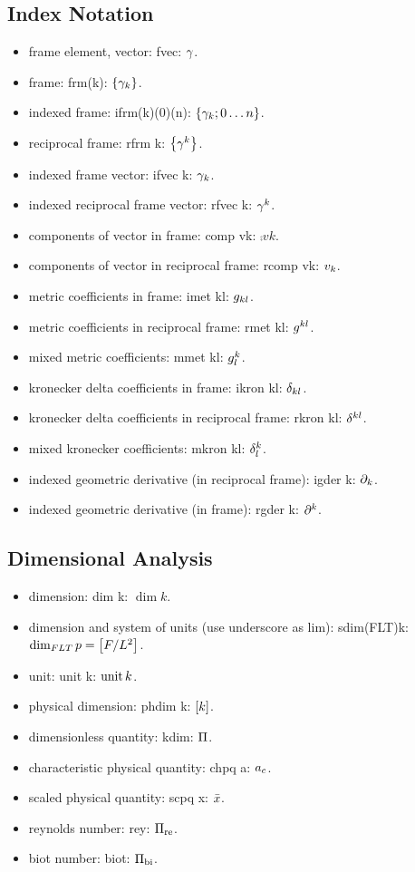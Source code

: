 \begin{multicols}{2}
\subsection{Index Notation}
\begin{itemize}
\item frame element, vector: fvec: $\gamma$.
\item frame: frm(k): $\left\lbrace{\gamma_{k}}\right\rbrace$.
\item indexed frame: ifrm(k)(0)(n): $\left\lbrace{\gamma_{k};{0}\dotsc{n}}\right\rbrace$.
\item reciprocal frame: rfrm k: $\left\lbrace{\gamma^{k}}\right\rbrace$.
\item indexed frame vector: ifvec k: $\gamma_{k}$.
\item indexed reciprocal frame vector: rfvec k: $\gamma^{k}$.
\item components of vector in frame: comp vk: $\comp vk$.
\item components of vector in reciprocal frame: rcomp vk: ${v}_{k}$.
\item metric coefficients in frame: imet kl: $g_{{k}{l}}$.
\item metric coefficients in reciprocal frame: rmet kl: $g^{{k}{l}}$.
\item mixed metric coefficients: mmet kl: $g^{k}_{l}$.
\item kronecker delta coefficients in frame: ikron kl: $\delta_{{k}{l}}$.
\item kronecker delta coefficients in reciprocal frame: rkron kl: $\delta^{{k}{l}}$.
\item mixed kronecker coefficients: mkron kl: $\delta^{k}_{l}$.
\item indexed geometric derivative (in reciprocal frame): igder k: $\partial_{k}$.
\item indexed geometric derivative (in frame): rgder k: $\partial^{k}$.
\end{itemize}


\subsection{Dimensional Analysis}
\begin{itemize}
\item dimension: dim k: $\dim k$.
\item dimension and system of units (use underscore as lim): sdim(FLT)k: $\operatorname*{dim}_{FLT}p = \left[{F/L^2}\right]$.
\item unit: unit k: $\operatorname{unit} k$.
\item physical dimension: phdim k: $\left[{k}\right]$.
\item dimensionless quantity: kdim: $\Pi$.
\item characteristic physical quantity: chpq a: ${a}_{c}$.
\item scaled physical quantity: scpq x: $\bar{x}$.
%
\item reynolds number: rey: $\Pi_\text{re}$.
\item biot number: biot: $\Pi_\text{bi}$.
\end{itemize}



\end{multicols}
